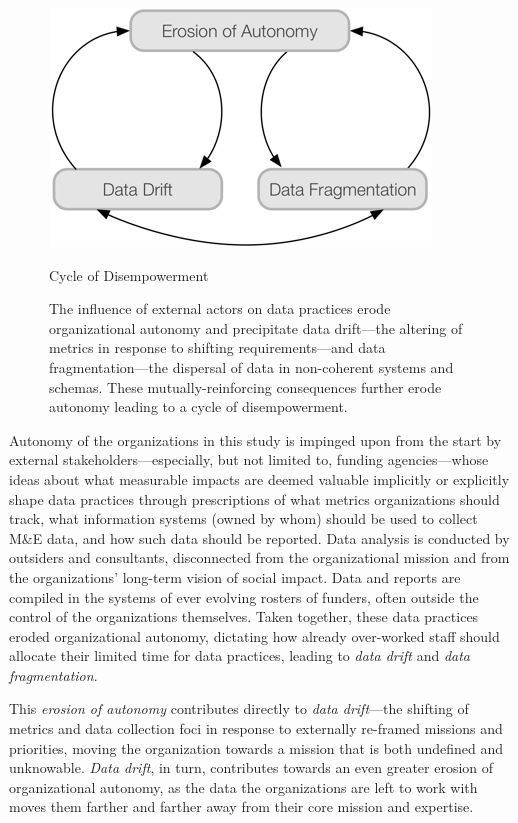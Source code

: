 \begin{figure}
  \centering
  \includegraphics[scale=1.00]{figures/dbd.png}
  \caption{Cycle of Disempowerment}
  \caption*{The influence of external actors on data practices erode organizational autonomy and precipitate data drift—the altering of metrics in response to shifting requirements—and data fragmentation—the dispersal of data in non-coherent systems and schemas. These mutually-reinforcing consequences further erode autonomy leading to a cycle of disempowerment.}
  \label{fig:dbd}
\end{figure}

Autonomy of the organizations in this study is impinged upon from the start by external stakeholders---especially, but not limited to, funding agencies---whose ideas about what measurable impacts are deemed valuable implicitly or explicitly shape data practices through prescriptions of what metrics organizations should track, what information systems (owned by whom) should be used to collect M\&E data, and how such data should be reported. Data analysis is conducted by outsiders and consultants, disconnected from the organizational mission and from the organizations’ long-term vision of social impact. Data and reports are compiled in the systems of ever evolving rosters of funders, often outside the control of the organizations themselves. Taken together, these data practices eroded organizational autonomy, dictating how already over-worked staff should allocate their limited time for data practices, leading to \textit{data drift} and \textit{data fragmentation}.

This \textit{erosion of autonomy} contributes directly to \textit{data drift}---the shifting of metrics and data collection foci in response to externally re-framed missions and priorities, moving the organization towards a mission that is both undefined and unknowable. \textit{Data drift}, in turn, contributes towards an even greater erosion of organizational autonomy, as the data the organizations are left to work with moves them farther and farther away from their core mission and expertise.

